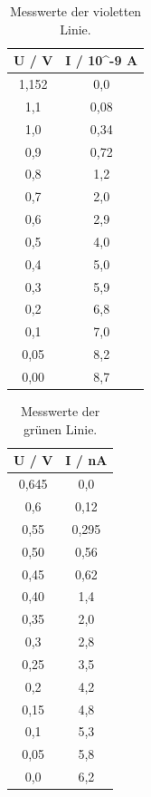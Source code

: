 \begin{table} 
  \centering
  \caption{Messwerte der violetten Linie.}
  \label{tab:spek2}
  \begin{tabular}{c c}
    \toprule
    U / V & I / 10\textasciicircum -9 A \\
    \midrule
    1,152 &         0,0 \\
      1,1 &        0,08 \\
      1,0 &        0,34 \\
      0,9 &        0,72 \\
      0,8 &         1,2 \\
      0,7 &         2,0 \\
      0,6 &         2,9 \\
      0,5 &         4,0 \\
      0,4 &         5,0 \\
      0,3 &         5,9 \\
      0,2 &         6,8 \\
      0,1 &         7,0 \\
     0,05 &         8,2 \\
     0,00 &         8,7 \\
    \bottomrule
    \end{tabular}
\end{table}

\begin{table}
  \centering
  \caption{Messwerte der grünen Linie.}
  \label{tab:spek3}
  \begin{tabular}{c c}
    \toprule
    U / V & I / nA \\
    \midrule
    0,645 &    0,0 \\
      0,6 &   0,12 \\
     0,55 &  0,295 \\
     0,50 &   0,56 \\
     0,45 &   0,62 \\
     0,40 &    1,4 \\
     0,35 &    2,0 \\
      0,3 &    2,8 \\
     0,25 &    3,5 \\
      0,2 &    4,2 \\
     0,15 &    4,8 \\
      0,1 &    5,3 \\
     0,05 &    5,8 \\
      0,0 &    6,2 \\
    \bottomrule
    \end{tabular}
\end{table}

